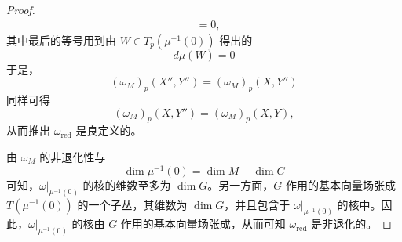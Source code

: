 \begin{proof}
\begin{align}
    &=0, \tag{5.2.11}
  \end{align}
  其中最后的等号用到由 $W\in T_p(\mu^{-1}(0))$ 得出的
  \begin{equation}
    d\mu(W)=0
    \tag{5.2.12}
  \end{equation}
  于是，
  \begin{equation}
    (\omega_M)_p(X'',Y'')=(\omega_M)_p(X,Y'')
    \tag{5.2.13}
  \end{equation}
  同样可得
  \begin{equation}
    (\omega_M)_p(X,Y'')=(\omega_M)_p(X,Y),
    \tag{5.2.14}
  \end{equation}
  从而推出 $\omega_{\mathrm{red}}$ 是良定义的。

  由 $\omega_M$ 的非退化性与
  \begin{equation}
    \dim\mu^{-1}(0)=\dim M-\dim G
    \tag{5.2.15}
  \end{equation}
  可知，$\omega|_{\mu^{-1}(0)}$ 的核的维数至多为 $\dim G$。另一方面，$G$ 作用的基本向量场张成 $T(\mu^{-1}(0))$ 的一个子丛，其维数为 $\dim G$，并且包含于 $\omega|_{\mu^{-1}(0)}$ 的核中。因此，$\omega|_{\mu^{-1}(0)}$ 的核由 $G$ 作用的基本向量场张成，从而可知 $\omega_{\mathrm{red}}$ 是非退化的。
\end{proof}



